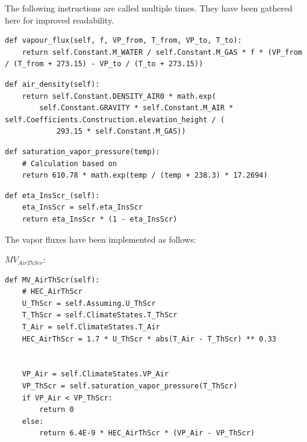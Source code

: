\documentclass[a4paper]{article}
\numberwithin{equation}{section}
\begin{document}
The following instructions are called multiple times.
They have been gathered here for improved readability.
\begin{mdframed}[leftline=false,rightline=false,backgroundcolor=magenta!10,nobreak=true]
  \begin{verbatim}
def vapour_flux(self, f, VP_from, T_from, VP_to, T_to):
    return self.Constant.M_WATER / self.Constant.M_GAS * f * (VP_from / (T_from + 273.15) - VP_to / (T_to + 273.15))
  \end{verbatim}
\end{mdframed}
\begin{mdframed}[leftline=false,rightline=false,backgroundcolor=magenta!10,nobreak=true]
  \begin{verbatim}
def air_density(self):
    return self.Constant.DENSITY_AIR0 * math.exp(
        self.Constant.GRAVITY * self.Constant.M_AIR * self.Coefficients.Construction.elevation_height / (
            293.15 * self.Constant.M_GAS))
  \end{verbatim}
\end{mdframed}
\begin{mdframed}[leftline=false,rightline=false,backgroundcolor=magenta!10,nobreak=true]
  \begin{verbatim}
def saturation_vapor_pressure(temp):
    # Calculation based on
    return 610.78 * math.exp(temp / (temp + 238.3) * 17.2694)
  \end{verbatim}
\end{mdframed}
\begin{mdframed}[leftline=false,rightline=false,backgroundcolor=magenta!10,nobreak=true]
  \begin{verbatim}
def eta_InsScr_(self):
    eta_InsScr = self.eta_InsScr
    return eta_InsScr * (1 - eta_InsScr)
  \end{verbatim}
\end{mdframed}


The vapor fluxes have been implemented as follows:

\(MV_{AirThScr}\):
\begin{mdframed}[leftline=false,rightline=false,backgroundcolor=magenta!10,nobreak=true]
  \begin{verbatim}
def MV_AirThScr(self):
    # HEC_AirThScr
    U_ThScr = self.Assuming.U_ThScr
    T_ThScr = self.ClimateStates.T_ThScr
    T_Air = self.ClimateStates.T_Air
    HEC_AirThScr = 1.7 * U_ThScr * abs(T_Air - T_ThScr) ** 0.33


    VP_Air = self.ClimateStates.VP_Air
    VP_ThScr = self.saturation_vapor_pressure(T_ThScr)
    if VP_Air < VP_ThScr:
        return 0
    else:
        return 6.4E-9 * HEC_AirThScr * (VP_Air - VP_ThScr)
  \end{verbatim}
\end{mdframed}
\end{document}
